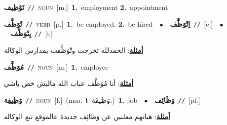 \documentclass[10pt,a4paper,twoside]{article} %
\begin{document}
\begin{multicols}{2}
{\setlength\topsep{0pt}\textbf{\foreignlanguage{arabic}{تَوْظِيف}}\ {\color{gray}\texttt{//}\color{black}}\ \textsc{noun}\ [m.]\ \textbf{1.}~employment  \textbf{2.}~appointment\ } \vspace{2mm}

{\setlength\topsep{0pt}\textbf{\foreignlanguage{arabic}{تْوَظَّف}}\ {\color{gray}\texttt{//}\color{black}}\ \textsc{verb}\ [p.]\ \textbf{1.}~be employed.  \textbf{2.}~be hired\ \ $\bullet$\ \ \setlength\topsep{0pt}\textbf{\foreignlanguage{arabic}{اِتْوَظَّف}}\ {\color{gray}\texttt{//}\color{black}}\ [c.]\ \ $\bullet$\ \ \setlength\topsep{0pt}\textbf{\foreignlanguage{arabic}{يِتْوَظَّف}}\ {\color{gray}\texttt{//}\color{black}}\ [i.]\  \begin{flushright}\color{gray}\foreignlanguage{arabic}{\textbf{\underline{\foreignlanguage{arabic}{أمثلة}}}: الحمدلله تخرجت وتَْوَظَّفت بمدارس الوكالة}\end{flushright}\color{black}} \vspace{2mm}

{\setlength\topsep{0pt}\textbf{\foreignlanguage{arabic}{مُوَظَّف}}\ {\color{gray}\texttt{//}\color{black}}\ \textsc{noun}\ [m.]\ \textbf{1.}~employee\  \begin{flushright}\color{gray}\foreignlanguage{arabic}{\textbf{\underline{\foreignlanguage{arabic}{أمثلة}}}: أنا مُوَظَّف عباب الله ماليش خص باشي}\end{flushright}\color{black}} \vspace{2mm}

{\setlength\topsep{0pt}\textbf{\foreignlanguage{arabic}{وَظِيفِة}}\ {\color{gray}\texttt{//}\color{black}}\ \textsc{noun}\ [f.]\ \color{gray}(msa. \foreignlanguage{arabic}{وَظِيفَة}~\foreignlanguage{arabic}{\textbf{١.}})\color{black}\ \textbf{1.}~job\ \ $\bullet$\ \ \setlength\topsep{0pt}\textbf{\foreignlanguage{arabic}{وَظَائِف}}\ {\color{gray}\texttt{//}\color{black}}\ [pl.]\  \begin{flushright}\color{gray}\foreignlanguage{arabic}{\textbf{\underline{\foreignlanguage{arabic}{أمثلة}}}: هياتهم معلنين عن وَظائِف جديدة عالموقع تبع الوكالة}\end{flushright}\color{black}} \vspace{2mm}


\end{multicols}
\end{document}
